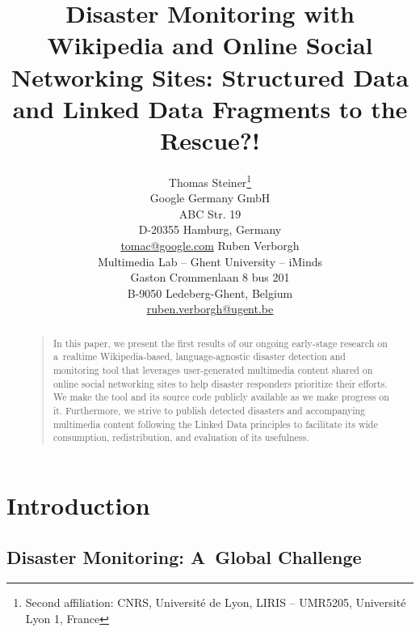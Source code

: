 \documentclass[letterpaper]{article}
\begin{document}
\title{Disaster Monitoring with Wikipedia and Online Social Networking Sites: Structured Data and Linked Data Fragments to the Rescue?!}
\author{Thomas Steiner\thanks{Second affiliation: CNRS, Université de Lyon, LIRIS -- UMR5205, Université Lyon 1, France}\\
Google Germany GmbH\\
ABC Str. 19\\
D-20355 Hamburg, Germany\\
\url{tomac@google.com}
\And
Ruben Verborgh\\
Multimedia Lab -- Ghent University -- iMinds\\
Gaston Crommenlaan 8 bus 201\\
B-9050 Ledeberg-Ghent, Belgium\\
\url{ruben.verborgh@ugent.be}
}
\maketitle
\begin{abstract}
\begin{quote}
In this paper, we present the first results of
our ongoing early-stage research on a~realtime Wikipedia-based,
language-agnostic disaster detection and monitoring tool
that leverages user-generated multimedia content
shared on online social networking sites
to help disaster responders prioritize their efforts.
We make the tool and its source code publicly available
as we make progress on it.
Furthermore, we strive to publish detected disasters
and accompanying multimedia content
following the Linked Data principles
to facilitate its wide consumption,
redistribution, and evaluation of its usefulness.

\end{quote}
\end{abstract}

\section{Introduction}

\subsection{Disaster Monitoring: A~Global Challenge}
\label{sec:natural-disaster-detection}
\end{document}
